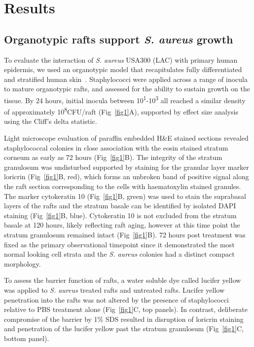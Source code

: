 \documentclass[10pt,letterpaper]{article}
\begin{document}
\section*{Results}


\subsection*{Organotypic rafts support \textit{S. aureus} growth}

To evaluate the interaction of \textit{S. aureus} USA300 (LAC) with primary human epidermis, we used an organotypic model that recapitulates fully differentiated and stratified human skin~\cite{simpson_rna_2010}.
Staphylococci were applied across a range of inocula to mature organotypic rafts, and assessed for the ability to sustain growth on the tissue.
By 24 hours, initial inocula between 10\textsuperscript{1}-10\textsuperscript{3} all reached a similar density of approximately 10\textsuperscript{8}CFU/raft (Fig~\ref{fig1}A), supported by effect size analysis using the Cliff's delta statistic.

Light microscope evaluation of paraffin embedded H\&E stained sections revealed staphylococcal colonies in close association with the eosin stained stratum corneum as early as 72 hours (Fig~\ref{fig1}B).
The integrity of the stratum granulosum was undisturbed supported by staining for the granular layer marker loricrin (Fig~\ref{fig1}B, red), which forms an unbroken band of positive signal along the raft section corresponding to the cells with haematoxylin stained granules.
The marker cytokeratin 10 (Fig~\ref{fig1}B, green) was used to stain the suprabasal layers of the rafts and the stratum basale can be identified by isolated DAPI staining (Fig~\ref{fig1}B, blue).
Cytokeratin 10 is not excluded from the stratum basale at 120 hours, likely reflecting raft aging, however at this time point the stratum granulosum remained intact (Fig~\ref{fig1}B).
72 hours post treatment was fixed as the primary observational timepoint since it demonstrated the most normal looking cell strata and the \textit{S. aureus} colonies had a distinct compact morphology.

To assess the barrier function of rafts, a water soluble dye called lucifer yellow was applied to \textit{S. aureus} treated rafts and untreated rafts.
Lucifer yellow penetration into the rafts was not altered by the presence of staphylococci relative to PBS treatment alone (Fig~\ref{fig1}C, top panels).
In contrast, deliberate compromise of the barrier by 1\% SDS resulted in disruption of loricrin staining and penetration of the lucifer yellow past the stratum granulosum (Fig~\ref{fig1}C, bottom panel).
\end{document}
